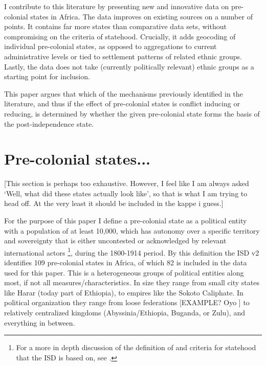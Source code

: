 \documentclass[12pt]{article}
\begin{document}
I contribute to this literature by presenting new and innovative data on
pre-colonial states in Africa. The data improves on existing sources on a number
of points. It contains far more states than comparative data sets, without
compromising on the criteria of statehood. Crucially, it adds geocoding of
individual pre-colonial states, as opposed to aggregations to current
administrative levels or tied to settlement patterns of related ethnic groups.
Lastly, the data does not take (currently politically relevant) ethnic groups as
a starting point for inclusion. %

This paper argues that which of the mechanisms previously identified in the
literature, and thus if the effect of pre-colonial states is conflict inducing
or reducing, is determined by whether the given pre-colonial state forms the
basis of the post-independence state.


\section{Pre-colonial states...}

[This section is perhaps too exhaustive. However, I feel like I am always asked
`Well, what did these states actually look like', so that is what I am trying to
head off. At the very least it should be included in the kappe i guess.]

For the purpose of this paper I define a pre-colonial state as a political
entity with a population of at least 10,000, which has autonomy over a specific
territory and sovereignty that is either uncontested or acknowledged by relevant
international actors \citep{Butcher2020}\footnote{For a more in depth discussion
of the definition of and criteria for statehood that the ISD is based on, see
\citet{Butcher2017}.}, during the 1800-1914 period. By this definition the ISD
v2 identifies 109 pre-colonial states in Africa, of which 82 is included in the
data used for this paper. This is a heterogeneous groups of political entities
along most, if not all measures/characteristics. In size they range from small
city states like Harar (today part of Ethiopia), to empires like the Sokoto
Caliphate. In political organization they range from loose federations [EXAMPLE?
Oyo \citep{Law1977}] to relatively centralized kingdoms (Abyssinia/Ethiopia,
Buganda, or Zulu), and everything in between. 
\end{document}
